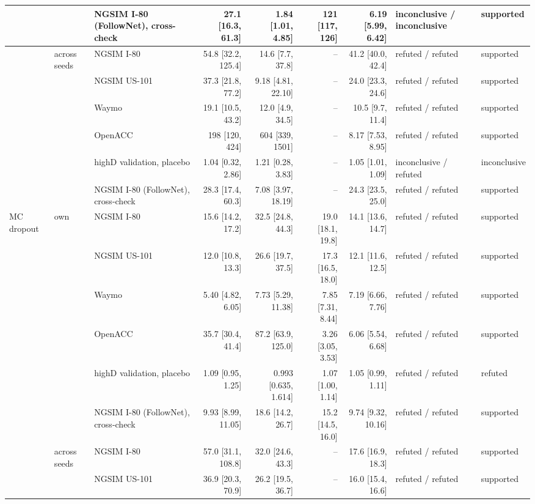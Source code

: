 \begin{longtable}{lllrrrrll}
 &  & NGSIM I-80 (FollowNet), cross-check & 27.1 [16.3, 61.3] & 1.84 [1.01, 4.85] & 121 [117, 126] & 6.19 [5.99, 6.42] & inconclusive / inconclusive & supported \\
\midrule
 & across seeds & NGSIM I-80 & 54.8 [32.2, 125.4] & 14.6 [7.7, 37.8] & -- & 41.2 [40.0, 42.4] & refuted / refuted & supported \\
 &  & NGSIM US-101 & 37.3 [21.8, 77.2] & 9.18 [4.81, 22.10] & -- & 24.0 [23.3, 24.6] & refuted / refuted & supported \\
 &  & Waymo & 19.1 [10.5, 43.2] & 12.0 [4.9, 34.5] & -- & 10.5 [9.7, 11.4] & refuted / refuted & supported \\
 &  & OpenACC & 198 [120, 424] & 604 [339, 1501] & -- & 8.17 [7.53, 8.95] & refuted / refuted & supported \\
 &  & highD validation, placebo & 1.04 [0.32, 2.86] & 1.21 [0.28, 3.83] & -- & 1.05 [1.01, 1.09] & inconclusive / refuted & inconclusive \\
 &  & NGSIM I-80 (FollowNet), cross-check & 28.3 [17.4, 60.3] & 7.08 [3.97, 18.19] & -- & 24.3 [23.5, 25.0] & refuted / refuted & supported \\
\midrule
MC dropout & own & NGSIM I-80 & 15.6 [14.2, 17.2] & 32.5 [24.8, 44.3] & 19.0 [18.1, 19.8] & 14.1 [13.6, 14.7] & refuted / refuted & supported \\
 &  & NGSIM US-101 & 12.0 [10.8, 13.3] & 26.6 [19.7, 37.5] & 17.3 [16.5, 18.0] & 12.1 [11.6, 12.5] & refuted / refuted & supported \\
 &  & Waymo & 5.40 [4.82, 6.05] & 7.73 [5.29, 11.38] & 7.85 [7.31, 8.44] & 7.19 [6.66, 7.76] & refuted / refuted & supported \\
 &  & OpenACC & 35.7 [30.4, 41.4] & 87.2 [63.9, 125.0] & 3.26 [3.05, 3.53] & 6.06 [5.54, 6.68] & refuted / refuted & supported \\
 &  & highD validation, placebo & 1.09 [0.95, 1.25] & 0.993 [0.635, 1.614] & 1.07 [1.00, 1.14] & 1.05 [0.99, 1.11] & refuted / refuted & refuted \\
 &  & NGSIM I-80 (FollowNet), cross-check & 9.93 [8.99, 11.05] & 18.6 [14.2, 26.7] & 15.2 [14.5, 16.0] & 9.74 [9.32, 10.16] & refuted / refuted & supported \\
\midrule
 & across seeds & NGSIM I-80 & 57.0 [31.1, 108.8] & 32.0 [24.6, 43.3] & -- & 17.6 [16.9, 18.3] & refuted / refuted & supported \\
 &  & NGSIM US-101 & 36.9 [20.3, 70.9] & 26.2 [19.5, 36.7] & -- & 16.0 [15.4, 16.6] & refuted / refuted & supported \\

\end{longtable}
